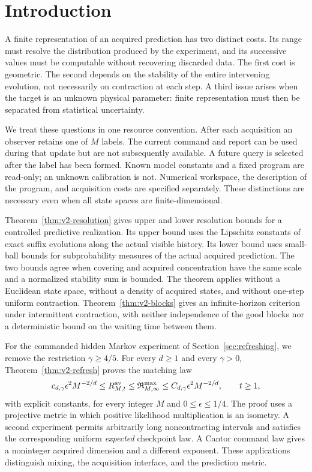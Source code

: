 \section{Introduction}\label{sec:v2-introduction}
A finite representation of an acquired prediction has two distinct costs.
Its range must resolve the distribution produced by the experiment, and its
successive values must be computable without recovering discarded data.
The first cost is geometric. The second depends on the stability of the
entire intervening evolution, not necessarily on contraction at each step.
A third issue arises when the target is an unknown physical parameter:
finite representation must then be separated from statistical uncertainty.

We treat these questions in one resource convention. After each acquisition
an observer retains one of $M$ labels. The current command and report can
be used during that update but are not subsequently available. A future
query is selected after the label has been formed. Known model constants
and a fixed program are read-only; an unknown calibration is not. Numerical
workspace, the description of the program, and acquisition costs are
specified separately. These distinctions are necessary even when all
state spaces are finite-dimensional.

Theorem~\ref{thm:v2-resolution} gives upper and lower resolution bounds
for a controlled predictive realization. Its upper bound uses the
Lipschitz constants of exact suffix evolutions along the actual visible
history. Its lower bound uses small-ball bounds for subprobability measures
of the actual acquired prediction. The two bounds agree when covering and
acquired concentration have the same scale and a normalized stability sum
is bounded. The theorem applies without a Euclidean state space, without a
density of acquired states, and without one-step uniform contraction.
Theorem~\ref{thm:v2-blocks} gives an infinite-horizon criterion under
intermittent contraction, with neither independence of the good blocks nor
a deterministic bound on the waiting time between them.

For the commanded hidden Markov experiment of
Section~\ref{sec:refreshing}, we remove the restriction
$\gamma\ge4/5$. For every $d\ge1$ and every $\gamma>0$,
Theorem~\ref{thm:v2-refresh} proves the matching law
\[
 c_{d,\gamma}\epsilon^2M^{-2/d}
 \le R_{M,t}^{\rm av}\le\mathfrak R_{M,\infty}^{\rm max}
 \le C_{d,\gamma}\epsilon^2M^{-2/d},
 \qquad t\ge1,
\]
with explicit constants, for every integer $M$ and $0\le\epsilon\le1/4$.
The proof uses a projective metric in which positive likelihood
multiplication is an isometry. A second experiment permits arbitrarily
long noncontracting intervals and satisfies the corresponding uniform
\emph{expected} checkpoint law. A Cantor command law gives a noninteger
acquired dimension and a different exponent. These applications distinguish
mixing, the acquisition interface, and the prediction metric.

